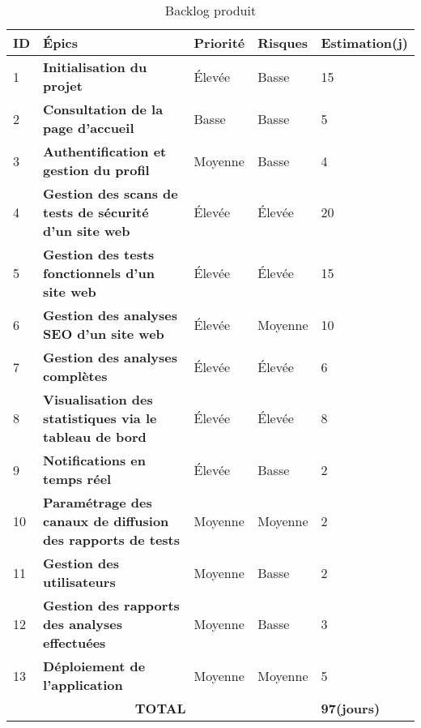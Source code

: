 \begin{spacing}{1}
    \begin{longtable}{|p{0.35cm}|p{9.3cm}|p{1.45cm}|p{1.45cm}|p{2.4cm}|}
        \caption{Backlog produit} \label{tab:backlog} \\\hline
        \textbf{\small ID} & \textbf{\small Épics} & \textbf{\small Priorité} & \textbf{\small Risques} & \textbf{\small Estimation(j)} \\ \hline
        1  & \textbf{Initialisation du projet} & Élevée & Basse & 15 \\
        \hline
        2 & \textbf{Consultation de la page d’accueil} & Basse & Basse & 5 \\
        \hline 
        3  & \textbf{Authentification et gestion du profil} & Moyenne & Basse & 4 \\
        \hline
       4  & \textbf{Gestion des scans de tests de sécurité d’un site web} & Élevée & Élevée & 20 \\
        \hline  
        5  & \textbf{Gestion des tests fonctionnels d’un site web} & Élevée & Élevée & 15 \\
        \hline 
        6  & \textbf{Gestion des analyses SEO d’un site web} & Élevée & Moyenne & 10 \\
        \hline      
        7  & \textbf{Gestion des analyses complètes} & Élevée & Élevée & 6 \\
        \hline
        8  & \textbf{Visualisation des statistiques via le tableau de bord} & Élevée & Élevée & 8 \\
        \hline
        9  & \textbf{Notifications en temps réel} & Élevée & Basse & 2 \\
        \hline
        10 & \textbf{Paramétrage des canaux de diffusion des rapports de tests} & Moyenne & Moyenne & 2 \\ 
        \hline
        11 & \textbf{Gestion des utilisateurs} & Moyenne & Basse & 2 \\
        \hline
        12 & \textbf{Gestion des rapports des analyses effectuées } & Moyenne & Basse & 3 \\
        \hline
        13 & \textbf{Déploiement de l'application} & Moyenne & Moyenne & 5 \\
        \hline
        \multicolumn{4}{|c|}{\textbf{TOTAL}} & \textbf{97(jours)} \\
        \hline 
    \end{longtable}
\end{spacing}
\vspace{-0.1cm}